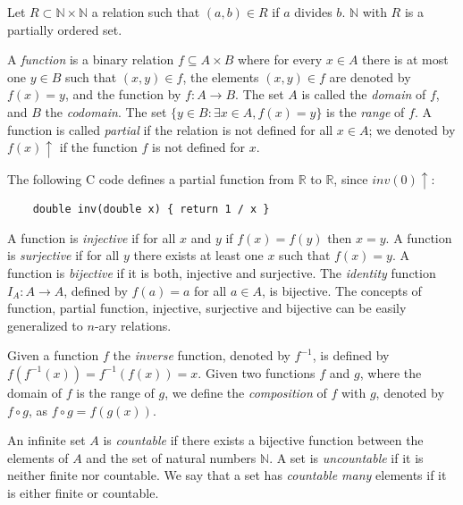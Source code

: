 \begin{example}
Let $R \subset \mathbb{N} \times \mathbb{N}$ a relation such that $(a, b) \in R$ if $a$ divides $b$. $\mathbb{N}$ with $R$ is a partially ordered set.
\end{example}

A \emph{function} is a binary relation $f \subseteq A \times B$ where for every $x \in A$ there is at most one $y \in B$ such that $\left(x, y\right) \in f$, the elements $\left(x, y\right) \in f$ are denoted by $f(x)=y$, and the function by $f : A \rightarrow B$. The set $A$ is called the \emph{domain} of $f$, and $B$ the \emph{codomain}. The set $\{ y \in B : \exists x \in A , f(x) = y\}$ is the \emph{range} of $f$. A function is called \emph{partial} if the relation is not defined for all $x \in A$; we denoted by $f(x) \uparrow$ if the function $f$ is not defined for $x$. 

\begin{example}
The following C code defines a partial function from $\mathbb{R}$ to $\mathbb{R}$, since $inv(0)\uparrow$:
\begin{verbatim}
    double inv(double x) { return 1 / x }
\end{verbatim}
\end{example}

A function is \emph{injective} if for all $x$ and $y$ if $f(x) = f(y)$ then $x=y$. A function is \emph{surjective} if for all $y$ there exists at least one $x$ such that $f(x) = y$. A function is \emph{bijective} if it is both, injective and surjective. The \emph{identity} function $I_A : A \rightarrow A$, defined by $f(a) = a$ for all $a \in A$, is bijective. The concepts of function, partial function, injective, surjective and bijective can be easily generalized to $n$-ary relations.

Given a function $f$ the \emph{inverse} function, denoted by $f^{-1}$, is defined by $f(f^{-1}(x)) = f^{-1}(f(x)) = x$. Given two functions $f$ and $g$, where the domain of $f$ is the range of $g$, we define the \emph{composition} of $f$ with $g$, denoted by $f \circ g$, as $f \circ g = f(g(x))$.

An infinite set $A$ is \emph{countable} if there exists a bijective function between the elements of $A$ and the set of natural numbers $\mathbb{N}$. A set is \emph{uncountable} if it is neither finite nor countable. We say that a set has \emph{countable many} elements if it is either finite or countable.

